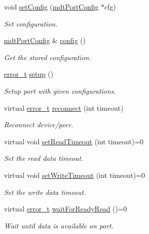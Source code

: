 \begin{DoxyCompactItemize}
void \hyperlink{classmdt_abstract_port_a48bdc0a8057c3b119763643098cf798f}{set\-Config} (\hyperlink{classmdt_port_config}{mdt\-Port\-Config} $\ast$cfg)
\begin{DoxyCompactList}\small\item\em Set configuration. \end{DoxyCompactList}\item 
\hyperlink{classmdt_port_config}{mdt\-Port\-Config} \& \hyperlink{classmdt_abstract_port_a3d105c90696f7c40f29c24fe9b6e4481}{config} ()
\begin{DoxyCompactList}\small\item\em Get the stored configuration. \end{DoxyCompactList}\item 
\hyperlink{classmdt_abstract_port_ad4121bb930c95887e77f8bafa065a85e}{error\-\_\-t} \hyperlink{classmdt_abstract_port_abc9f1154ac71c4e31ac3e7a3ff4c5182}{setup} ()
\begin{DoxyCompactList}\small\item\em Setup port with given configurations. \end{DoxyCompactList}\item 
virtual \hyperlink{classmdt_abstract_port_ad4121bb930c95887e77f8bafa065a85e}{error\-\_\-t} \hyperlink{classmdt_abstract_port_aec74b2db1a629d98a95d8f042ea96653}{reconnect} (int timeout)
\begin{DoxyCompactList}\small\item\em Reconnect device/peer. \end{DoxyCompactList}\item 
virtual void \hyperlink{classmdt_abstract_port_a6589b04467e0073d18ba872201bdcd84}{set\-Read\-Timeout} (int timeout)=0
\begin{DoxyCompactList}\small\item\em Set the read data timeout. \end{DoxyCompactList}\item 
virtual void \hyperlink{classmdt_abstract_port_a12eb422d52ebb09a650f8497b258c2e7}{set\-Write\-Timeout} (int timeout)=0
\begin{DoxyCompactList}\small\item\em Set the write data timeout. \end{DoxyCompactList}\item 
virtual \hyperlink{classmdt_abstract_port_ad4121bb930c95887e77f8bafa065a85e}{error\-\_\-t} \hyperlink{classmdt_abstract_port_aeda364cb191da1038a22dd1fc06a1d49}{wait\-For\-Ready\-Read} ()=0
\begin{DoxyCompactList}\small\item\em Wait until data is available on port. \end{DoxyCompactList}\item 

\end{DoxyCompactItemize}
